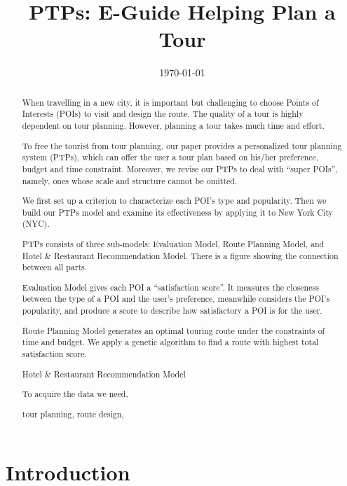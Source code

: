 \documentclass{mcmthesis}
\begin{document}
\linespread{0.6}
\setlength{\parskip}{0.5\baselineskip}
\title{PTPs: E-Guide Helping Plan a Tour}%

\date{\today}
\begin{abstract}
    When travelling in a new city, it is important but challenging to choose Points of Interests (POIs) to visit and design the route. The quality of a tour is highly dependent on tour planning. However, planning a tour takes much time and effort. \par
  To free the tourist from tour planning, our paper provides a personalized tour planning system (PTPs), which can offer the user a tour plan based on his/her preference, budget and time constraint. Moreover, we revise our PTPs to deal with ``super POIs'', namely, ones whose scale and structure cannot be omitted. \par
  We first set up a criterion to characterize each POI's type and popularity. Then we build our PTPs model and examine its effectiveness by applying it to New York City (NYC).\par
  PTPs consists of three sub-models: Evaluation Model, Route Planning Model, and Hotel \& Restaurant Recommendation Model. There is a figure showing the connection between all parts.\par
  Evaluation Model gives each POI a ``satisfaction score''. It measures the closeness between the type of a POI and the user's preference, meanwhile considers the POI's popularity, and produce a score to describe how satisfactory a POI is for the user.\par
  Route Planning Model generates an optimal touring route under the constraints of time and budget. We apply a genetic algorithm to find a route with highest total satisfaction score. \par
  Hotel \& Restaurant Recommendation Model 

  To acquire the data we need, 
	\begin{keywords}
    tour planning, route design, 
	\end{keywords}
\end{abstract}

\maketitle
\tableofcontents

\newpage

\section{Introduction}	
\end{document}
